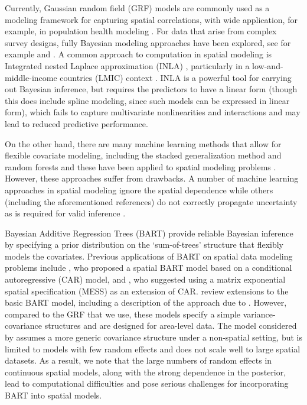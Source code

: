 \documentclass[a4paper,12pt]{article}
\begin{document}
Currently, Gaussian random field (GRF) models are commonly used as a modeling framework for capturing spatial correlations, with wide application, for example, in population health modeling \citep{diggle2019model}. {\color{blue}For data that arise from complex survey designs, fully Bayesian modeling approaches have been explored, see for example \cite{chan2020bayesian, banerjee2024finite} and \cite{finley2024models}.} A common approach to computation in spatial modeling is Integrated nested Laplace approximation (INLA) \citep{rue2009approximate}, particularly in a low-and-middle-income countries (LMIC) context \citep{utazi2018high, burstein2019mapping}. INLA is a powerful tool for carrying out Bayesian inference, but requires the predictors to have a linear form (though this does include spline modeling, since such models can be expressed in linear form), which fails to capture multivariate nonlinearities and interactions and may lead to reduced predictive performance.

On the other hand, there are many machine learning methods that allow for flexible covariate modeling, including the stacked generalization method \citep{davies2016optimal} and random forests \citep{ren2018} and these have been applied to spatial modeling problems \citep{osgood2018mapping, shi2021digital}. However, these approaches suffer from drawbacks. {\color{blue}A number of machine learning approaches in spatial modeling ignore the spatial dependence \citep{georganos2021geographical} while others (including the aforementioned references) do not correctly propagate uncertainty as is required for valid inference \citep{daw2023reds,wakefield2019estimating}}. %

Bayesian Additive Regression Trees (BART) \citep{chipman2010bart} provide reliable Bayesian inference by specifying a prior distribution on the `sum-of-trees' structure that flexibly models the covariates. Previous applications of BART on spatial data modeling problems include \cite{muller2007spatially}, who proposed a spatial BART model based on a conditional autoregressive (CAR) model, and \cite{Krueger2020}, who suggested using a matrix exponential spatial specification (MESS) \citep{lesage07} as an extension of CAR.  \cite{tan2019bayesian} review extensions to the basic BART  model, including a description of the approach due to \cite{muller2007spatially}.  However, compared to the GRF that we use, these models specify a simple variance-covariance structures and are designed for area-level data. The model considered by \cite{spanbauer2021nonparametric} assumes a more generic covariance structure under a non-spatial setting, but is limited to models with few random effects and does not scale well to large spatial datasets. As a result, we note that the large numbers of random effects in continuous spatial models, along with the strong dependence in the posterior, lead to computational difficulties and pose serious challenges for incorporating BART into spatial models.  
\end{document}
